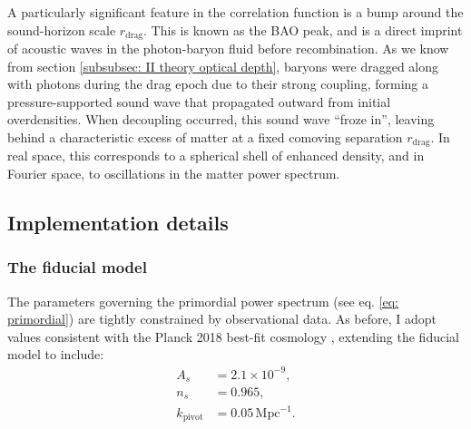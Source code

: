 \documentclass{aa}
\numberwithin{equation}{section}
\numberwithin{table}{section}
\numberwithin{figure}{section}
\begin{document}

A particularly significant feature in the correlation function is a bump around the sound-horizon scale $r_\text{drag}$. This is known as the BAO peak, and is a direct imprint of acoustic waves in the photon-baryon fluid before recombination. As we know from section \ref{subsubsec: II theory optical depth}, baryons were dragged along with photons during the drag epoch due to their strong coupling, forming a pressure-supported sound wave that propagated outward from initial overdensities. When decoupling occurred, this sound wave ``froze in'', leaving behind a characteristic excess of matter at a fixed comoving separation $r_\text{drag}$. In real space, this corresponds to a spherical shell of enhanced density, and in Fourier space, to oscillations in the matter power spectrum. 





\subsection{Implementation details}\label{subsec: IV methods}

\subsubsection{The fiducial model}
The parameters governing the primordial power spectrum (see eq. \eqref{eq: primordial}) are tightly constrained by observational data. As before, I adopt values consistent with the Planck 2018 best-fit cosmology \citep[see][]{Planck}, extending the fiducial model to include:
\begin{align*}
  A_s &= 2.1 \times 10^{-9},
  \\
  n_s &= 0.965,
  \\
  k_\text{pivot} &= 0.05\,\text{Mpc}^{-1}.
\end{align*}
\end{document}
